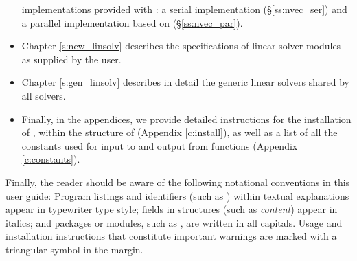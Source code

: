 \begin{itemize}
  implementations provided with {\sundials}: a serial implementation
  (\S\ref{ss:nvec_ser}) and a parallel implementation based on
  {\mpi} (\S\ref{ss:nvec_par}).
\item
  Chapter \ref{s:new_linsolv} describes the specifications of linear
  solver modules as supplied by the user.
\item
  Chapter \ref{s:gen_linsolv} describes in detail the generic linear solvers shared 
  by all {\sundials} solvers.
\item
  Finally, in the appendices, we provide detailed instructions for the installation
  of {\cvodes}, within the structure of {\sundials} (Appendix \ref{c:install}), as well
  as a list of all the constants used for input to and output from {\cvodes} functions
  (Appendix \ref{c:constants}).
\end{itemize}

Finally, the reader should be aware of the following notational conventions
in this user guide:  Program listings and identifiers (such as ) 
within textual explanations appear in typewriter type style; 
fields in {\C} structures (such as {\em content}) appear in italics;
and packages or modules, such as {\cvdense}, are written in all capitals.
Usage and installation instructions that constitute important warnings
are marked with a triangular symbol {\warn} in the margin.
